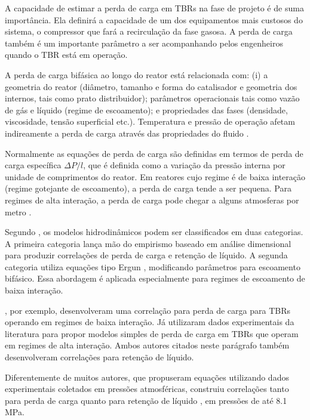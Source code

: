 A capacidade de estimar a perda de carga em TBRs na fase de projeto é de suma
importância. Ela definirá a capacidade de um dos equipamentos mais custosos do
sistema, o compressor que fará a recirculação da fase gasosa. A perda de carga
também é um importante parâmetro a ser acompanhando pelos engenheiros quando o
TBR está em operação.

A perda de carga bifásica ao longo do reator está relacionada com: (i) a
geometria do reator (diâmetro, tamanho e forma do catalisador e geometria dos
internos, tais como prato distribuidor); parâmetros operacionais tais como vazão
de gás e líquido (regime de escoamento); e propriedades das fases (densidade,
viscosidade, tensão superficial etc.). Temperatura e pressão de operação afetam
indireamente a perda de carga através das propriedades do fluido
\cite{Ranade2011}.

Normalmente as equações de perda de carga são definidas em termos de perda de
carga específica $\Delta P/l$, que é definida como a variação da pressão interna
por unidade de comprimentos do reator. Em reatores cujo regime é de baixa
interação (regime gotejante de escoamento), a perda de carga tende a ser
pequena. Para regimes de alta interação, a perda de carga pode chegar a alguns
atmosferas por metro \cite{Benkrid1997}.


Segundo , os modelos hidrodinâmicos podem ser
classificados em duas categorias. A primeira categoria lança mão do empirismo
baseado em análise dimensional para produzir correlações de perda de carga e
retenção de líquido. A segunda categoria utiliza equações tipo Ergun
, modificando parâmetros para escoamento bifásico.
Essa abordagem é aplicada especialmente para regimes de escoamento de baixa
interação.

, por exemplo, desenvolveram uma correlação para perda
de carga para TBRs operando em regimes de baixa interação. Já
 utilizaram dados experimentais  da literatura para propor modelos
simples de perda de carga em TBRs que operam em regimes de alta
interação. Ambos autores citados neste parágrafo também desenvolveram
correlações para retenção de líquido.

Diferentemente de muitos autores, que propuseram equações utilizando dados
experimentais coletados em pressões atmosféricas, 
construiu correlações tanto para perda de carga quanto para retenção de líquido
, em pressões de até 8.1 MPa.

